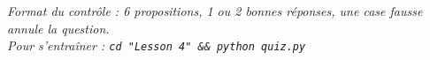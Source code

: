 \documentclass[a4paper,10pt]{article}
\begin{document}
\vspace{0.4em}
\begin{center}
\footnotesize\itshape
Format du contrôle : 6 propositions, 1 ou 2 bonnes réponses, une case fausse
annule la question.\\
Pour s'entraîner : \texttt{cd "Lesson 4" \&\& python quiz.py}
\end{center}
\end{document}
